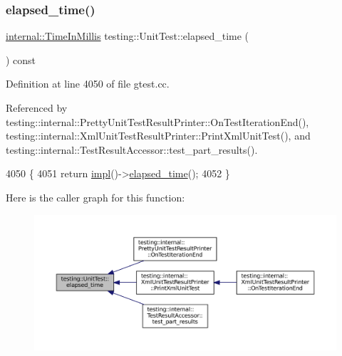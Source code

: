 \subsubsection{\texorpdfstring{elapsed\+\_\+time()}{elapsed\_time()}}
{\footnotesize\ttfamily \hyperlink{namespacetesting_1_1internal_a66a845df404b38fe85c5e14a069f255a}{internal\+::\+Time\+In\+Millis} testing\+::\+Unit\+Test\+::elapsed\+\_\+time (\begin{DoxyParamCaption}{ }\end{DoxyParamCaption}) const}



Definition at line 4050 of file gtest.\+cc.



Referenced by testing\+::internal\+::\+Pretty\+Unit\+Test\+Result\+Printer\+::\+On\+Test\+Iteration\+End(), testing\+::internal\+::\+Xml\+Unit\+Test\+Result\+Printer\+::\+Print\+Xml\+Unit\+Test(), and testing\+::internal\+::\+Test\+Result\+Accessor\+::test\+\_\+part\+\_\+results().


\begin{DoxyCode}
4050                                                   \{
4051   \textcolor{keywordflow}{return} \hyperlink{classtesting_1_1UnitTest_a4df5d11a58affb337d7fa62eaa07690e}{impl}()->\hyperlink{classtesting_1_1internal_1_1UnitTestImpl_a4376881063f945dcc8ec4dbb38b5ecc1}{elapsed\_time}();
4052 \}
\end{DoxyCode}
Here is the caller graph for this function\+:
\nopagebreak
\begin{figure}[H]
\begin{center}
\leavevmode
\includegraphics[width=350pt]{classtesting_1_1UnitTest_acf608411a17cb3b40a1e9d724f262b3b_icgraph}
\end{center}
\end{figure}
\mbox{\label{classtesting_1_1UnitTest_a706f29e765916616b11a271a65948727}} 
